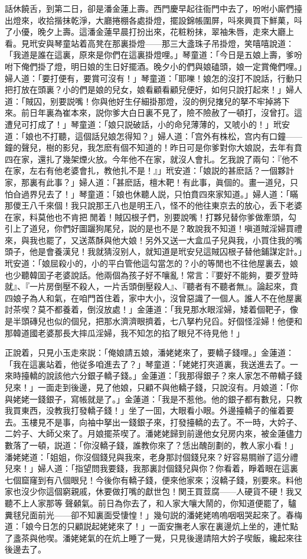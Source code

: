 話休饒舌，到第二日，卻是潘金蓮上壽。西門慶早起往衙門中去了，吩咐小廝們擡出燈來，收拾揩抹乾淨，大廳捲棚各處掛燈，擺設錦帳圍屏，呌來興買下鮮菓，呌了小優，晚夕上壽。這潘金蓮早晨打扮出來，花粧粉抹，翠袖朱唇，走來大廳上看。見玳安與琴童站着高凳在那裏掛燈——那三大盞珠子吊掛燈，笑嘻嘻說道：「我道是誰在這裏，原來是你們在這裏掛燈哩。」琴童道：「今日是五娘上壽，爹吩咐下俺們掛了燈，明日娘的生日好擺酒。晚夕小的們與娘磕頭，娘一定賞俺們哩。」婦人道：「要打便有，要賞可沒有！」琴童道：「耶嚛！娘怎的沒打不說話，行動只把打放在頭裏？小的們是娘的兒女，娘看顧看顧兒便好，如何只說打起來！」婦人道：「賊囚，别要説嘴！你與他好生仔細掛那燈，沒的例兒撦兒的拏不牢掉將下來。前日年裏為崔本來，説你爹大白日裏不見了，險不險赦了一頓打，沒曾打。這遭兒可打成了！」琴童道：「娘只説破話，小的命兒薄薄的，又唬小的！」玳安道：「娘也不打聽，這個話兒娘怎得知？」婦人道：「宫外有株松，宫内有口鐘——鐘的聲兒，樹的影兒，我怎麽有個不知道的！昨日可是你爹對你大娘説，去年有賁四在家，還扎了幾架煙火放。今年他不在家，就沒人會扎。乞我說了兩句：『他不在家，左右有他老婆會扎，教他扎不是！』」玳安道：「娘説的甚麽話？一個夥計家，那裏有此事？」婦人道：「甚麽話，檀木靶！有此事，眞個的。畫一道兒，只怕㒲過界兒去了！」琴童道：「娘也休聽人説，只怕賁四來家知道。」婦人道：「瞞那儍王八千來個！我只說那王八也是明王八，怪不的他往東京去的放心，丢下老婆在家，料莫他也不肯把𣭈閒着！賊囚根子們，別要說嘴！打夥兒替你爹做牽頭，勾引上了道兒，你們好圖躧狗尾兒，説的是也不是？敢說我不知道！嗔道賊淫婦買禮來，與我也罷了，又送蒸酥與他大娘！另外又送一大盒瓜子兒與我，小買住我的嘴頭子，他是會養漢兒！我就猜沒别人，就知道是玳安兒這賊囚根子替他鋪謀定計。」玳安道：「娘屈殺小的，小的平白管他這勾當怎的？小的等閒也不往他屋裏去，娘也少聽韓囬子老婆說話。他兩個為孩子好不嚷亂！常言：『要好不能夠，要歹登時就』、『一片房倒壓不殺人，一片舌頭倒壓殺人』、『聽者有不聽者無』。論起來，賁四娘子為人和氣，在咱門首住着，家中大小，沒曾惡識了一個人。誰人不在他屋裏討茶喫？莫不都養着，倒沒放處！」金蓮道：「我見那水眼淫婦，矮着個靶子，像是半頭磚兒也似的個兒，把那水濟濟眼擠着，七八拏杓兒舀。好個怪淫婦！他便和那韓道國老婆那長大摔瓜淫婦，我不知怎的掐了眼兒不待見他！」

正說着，只見小玉走來説：「俺娘請五娘，潘姥姥來了，要轎子錢哩。」金蓮道：「我在這裏站着，他従多咱進去了？」琴童道：「姥姥打夾道裏，我送進去了。一來時擡轎的說該他六分銀子轎子錢。」金蓮道：「我那得銀子？來人家怎不帶轎子錢兒來！」一面走到後邊，見了他娘，只顧不與他轎子錢，只說沒有。月娘道：「你與姥姥一錢銀子，寫帳就是了。」金蓮道：「我是不惹他。他的銀子都有數兒，只教我買東西，没教我打發轎子錢！」坐了一囬，大眼看小眼。外邊擡轎子的催着要去。玉樓見不是事，向袖中拏出一錢銀子來，打發擡轎的去了。不一時，大妗子、二妗子、大師父來了。月娘擺茶喫了。潘姥姥歸到前邊他女兒房内來，被金蓮儘力數落了一頓，説道：「你沒轎子錢，誰教你來了？恁出醜㓦劃的，教人家小看！」潘姥姥道：「姐姐，你沒個錢兒與我來，老身那討個錢兒來？好容易賙辦了這分禮兒來！」婦人道：「指望問我要錢，我那裏討個錢兒與你？你看着，睜着眼在這裏七個窟窿到有八個眼兒！今後你有轎子錢，便來他家來；沒轎子錢，别要來。料他家也沒少你這個窮親戚，休要做打嘴的獻世包！関王買荳腐——人硬貨不硬！我又聽不上人家那等𣭈聲顙氣。前日為你去了，和人家大嚷大鬧的，你知道便罷了，驢糞毬兒面前光——卻不知裏面受悽惶！」幾句説的潘姥姥嗚嗚咽咽哭起來了。春梅道：「娘今日怎的只顧説起姥姥來了！」一面安撫老人家在裏邊炕上坐的，連忙點了盞茶與他喫。潘姥姥氣的在炕上睡了一覺，只見後邊請陪大妗子喫飯，纔起來往後邊去了。


